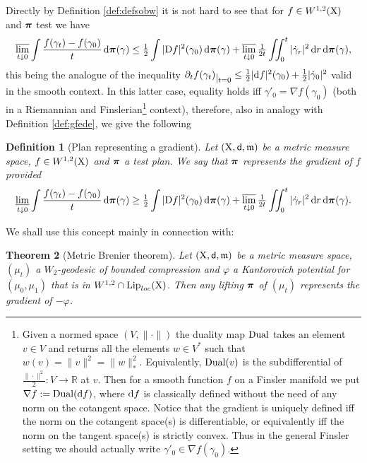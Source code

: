 \documentclass[11pt]{article}
\numberwithin{equation}{section}
\newtheorem{theorem}{Theorem}[section]
\newtheorem{definition}[theorem]{Definition}
\newcommand{\R}{\mathbb{R}}
\newcommand{\ppi}{{\mbox{\boldmath$\pi$}}}
\newcommand{\restr}[1]{\lower3pt\hbox{$|_{#1}$}}
\newcommand{\X}{{\rm X}}
\newcommand{\sfd}{{\sf d}}
\newcommand{\mm}{{\mathfrak m}}
\renewcommand{\d}{{\rm d}}
\newcommand{\D}{{\rm D}}
\newcommand{\Lip}{{\rm Lip}}
\newcommand{\lims}{\varlimsup}
\newcommand{\limi}{\varliminf}
\begin{document}
Directly by Definition \ref{def:defsobw} it is not hard to see  that for $f\in W^{1,2}(\X)$ and $\ppi$ test  we have
\begin{equation}
\label{eq:perreprgr}
\lims_{t\downarrow0}\int\frac{f(\gamma_t)-f(\gamma_0)}{t}\,\d\ppi(\gamma)\leq\tfrac12\int|\D f|^2(\gamma_0)\,\d\ppi(\gamma)+\lims_{t\downarrow0}\tfrac1{2t}\iint_0^t|\dot\gamma_r|^2\,\d r\,\d\ppi(\gamma),
\end{equation}
this being the analogue of the inequality $\partial_tf(\gamma_t)\restr{t=0}\leq \tfrac12|\d f|^2(\gamma_0)+\tfrac12|\dot\gamma_0|^2$ valid in the smooth context. In this latter case, equality holds iff $\gamma'_0=\nabla f(\gamma_0)$ (both in a Riemannian and Finslerian\footnote{Given a normed space $(V,\|\cdot\|)$ the duality map ${\rm Dual}$ takes an element $v\in V$ and returns all the elements $w\in V^*$ such that $w(v)=\|v\|^2=\|w\|_*^2$. Equivalently, ${\rm Dual}(v)$ is the subdifferential of $\tfrac{\|\cdot\|^2}2:V\to\R$ at $v$. Then for a smooth function $f$ on a Finsler manifold we put $\nabla f:={\rm Dual}(\d f)$, where $\d f$ is classically defined without the need of any norm on the cotangent space. Notice that the gradient  is uniquely defined iff the norm on the cotangent space(s) is differentiable, or equivalently iff the norm on the tangent space(s) is strictly convex. Thus in the general Finsler setting we should actually write $\gamma'_0\in\nabla f(\gamma_0)$.} context), therefore, also in analogy with Definition \ref{def:gfede}, we give the following 
\begin{definition}[Plan representing a gradient]\label{def:planrepgr}
Let $(\X,\sfd,\mm)$ be a metric measure space, $f\in W^{1,2}(\X)$ and $\ppi$ a test plan. We say that $\ppi$ represents the gradient of $ f$ provided  
\begin{equation}
\label{eq:derreprgr}
\limi_{t\downarrow0}\int\frac{f(\gamma_t)-f(\gamma_0)}{t}\,\d\ppi(\gamma)\geq\tfrac12\int|\D f|^2(\gamma_0)\,\d\ppi(\gamma)+\lims_{t\downarrow0}\tfrac1{2t}\iint_0^t|\dot\gamma_r|^2\,\d r\,\d\ppi(\gamma).
\end{equation}
\end{definition}
We shall use this concept mainly in connection with:
\begin{theorem}[Metric Brenier theorem]\label{thm:metbr}
Let $(\X,\sfd,\mm)$ be a metric measure space, $(\mu_t)$ a $W_2$-geodesic of bounded compression and  $\varphi$ a Kantorovich potential for $(\mu_0,\mu_1)$ that is in $W^{1,2} \cap \Lip_{loc}(\X)$.  Then any lifting  $\ppi$ of $(\mu_t)$ represents the gradient of $-\varphi$.
\end{theorem}
\end{document}
